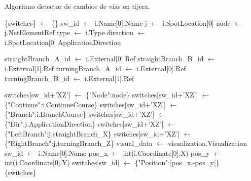 	\begin{algorithm}[H]
		\caption{Algoritmo detector de cambios de vías en tijera.}
		\label{alg:switches_3}
		\begin{algorithmic}
			\STATE \{switches\} $\gets$ \{\}
						\STATE sw\_id $\gets$ i.Name[0].Name
						\STATE j $\gets$ i.SpotLocation[0]
						\STATE node $\gets$ j.NetElementRef
						\STATE type $\gets$ i.Type
						\STATE direction $\gets$ i.SpotLocation[0].ApplicationDirection
						
							\STATE straightBranch\_A\_id $\gets$ i.External[0].Ref
							\STATE straightBranch\_B\_id $\gets$ i.External[1].Ref
							\STATE turningBranch\_A\_id $\gets$ i.External[0].Ref
							\STATE turningBranch\_B\_id $\gets$ i.External[1].Ref
							
								\STATE switches[sw\_id+'XZ'] $\gets$ \{"Node":node\}
								\STATE switches[sw\_id+'XZ'] $\gets$ \{"Continue":i.ContinueCourse\}
								\STATE switches[sw\_id+'XZ'] $\gets$ \{"Branch":i.BranchCourse\}
								\STATE switches[sw\_id+'XZ'] $\gets$ \{"Dir":j.ApplicationDirection\}
								\STATE switches[sw\_id+'XZ'] $\gets$ \{"LeftBranch":j.straightBranch\_X\}
								\STATE switches[sw\_id+'XZ'] $\gets$ \{"RightBranch":j.turningBranch\_Z\}
							\ENDFOR
						\ENDIF	
					\ENDIF
				\ENDFOR
			\ENDIF
			\STATE visual\_data $\gets$ visualization.Visualization
					\STATE sw\_id $\gets$ i.Name[0].Name
					\STATE pos\_x $\gets$ int(i.Coordinate[0].X)
					\STATE pos\_y $\gets$ int(i.Coordinate[0].Y)
					\STATE switches[sw\_id] $\gets$ \{"Position":[pos\_x,-pos\_y]\}
					\ENDIF 
				\ENDFOR
			\ENDIF
			\OUTPUT \{switches\}
		\end{algorithmic}
	\end{algorithm}
    